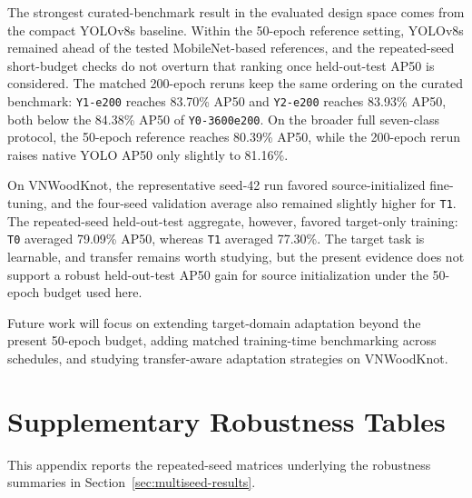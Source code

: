 \documentclass[journal,article,submit,moreauthors,pdftex]{Definitions/tsp}
\begin{document}
The strongest curated-benchmark result in the evaluated design space comes from the compact YOLOv8s baseline. Within the 50-epoch reference setting, YOLOv8s remained ahead of the tested MobileNet-based references, and the repeated-seed short-budget checks do not overturn that ranking once held-out-test AP50 is considered. The matched 200-epoch reruns keep the same ordering on the curated benchmark: \texttt{Y1-e200} reaches 83.70\% AP50 and \texttt{Y2-e200} reaches 83.93\% AP50, both below the 84.38\% AP50 of \texttt{Y0-3600e200}. On the broader full seven-class protocol, the 50-epoch reference reaches 80.39\% AP50, while the 200-epoch rerun raises native YOLO AP50 only slightly to 81.16\%.

On VNWoodKnot, the representative seed-42 run favored source-initialized fine-tuning, and the four-seed validation average also remained slightly higher for \texttt{T1}. The repeated-seed held-out-test aggregate, however, favored target-only training: \texttt{T0} averaged 79.09\% AP50, whereas \texttt{T1} averaged 77.30\%. The target task is learnable, and transfer remains worth studying, but the present evidence does not support a robust held-out-test AP50 gain for source initialization under the 50-epoch budget used here.

Future work will focus on extending target-domain adaptation beyond the present 50-epoch budget, adding matched training-time benchmarking across schedules, and studying transfer-aware adaptation strategies on VNWoodKnot.

\appendix
\section{Supplementary Robustness Tables}
\label{sec:appendix-robustness}

This appendix reports the repeated-seed matrices underlying the robustness summaries in Section~\ref{sec:multiseed-results}.
\end{document}
